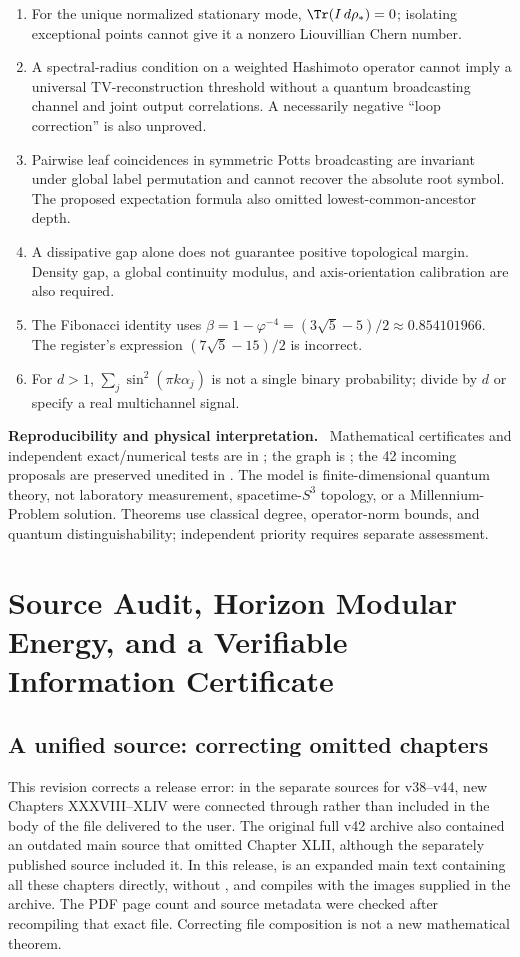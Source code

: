 \documentclass[11pt,a4paper,oneside]{book}
\newcommand{\note}[1]{\par\medskip\noindent\textbf{#1}\ }
\begin{document}
\begin{enumerate}
\item For the unique normalized stationary mode, $\Tr(I\,d\rho_*)=0$; isolating exceptional points cannot give it a nonzero Liouvillian Chern number.
\item A spectral-radius condition on a weighted Hashimoto operator cannot imply a universal TV-reconstruction threshold without a quantum broadcasting channel and joint output correlations. A necessarily negative ``loop correction'' is also unproved.
\item Pairwise leaf coincidences in symmetric Potts broadcasting are invariant under global label permutation and cannot recover the absolute root symbol. The proposed expectation formula also omitted lowest-common-ancestor depth.
\item A dissipative gap alone does not guarantee positive topological margin. Density gap, a global continuity modulus, and axis-orientation calibration are also required.
\item The Fibonacci identity uses $\beta=1-\varphi^{-4}=(3\sqrt5-5)/2\approx0.854101966$. The register's expression $(7\sqrt5-15)/2$ is incorrect.
\item For $d>1$, $\sum_j\sin^2(\pi k\alpha_j)$ is not a single binary probability; divide by $d$ or specify a real multichannel signal.
\end{enumerate}
\note{Reproducibility and physical interpretation.} Mathematical certificates and independent exact/numerical tests are in ; the graph is ; the 42 incoming proposals are preserved unedited in . The model is finite-dimensional quantum theory, not laboratory measurement, spacetime-$S^3$ topology, or a Millennium-Problem solution. Theorems use classical degree, operator-norm bounds, and quantum distinguishability; independent priority requires separate assessment.
\setcounter{equation}{222}


\chapter{Source Audit, Horizon Modular Energy, and a Verifiable Information Certificate}
\section{A unified source: correcting omitted chapters}
This revision corrects a release error: in the separate sources for v38--v44, new Chapters XXXVIII--XLIV were connected through \verb|| rather than included in the body of the file delivered to the user. The original full v42 archive also contained an outdated main source that omitted Chapter XLII, although the separately published source included it. In this release,  is an expanded main text containing all these chapters directly, without \verb||, and compiles with the images supplied in the archive. The PDF page count and source metadata were checked after recompiling that exact file. Correcting file composition is not a new mathematical theorem.
\end{document}
